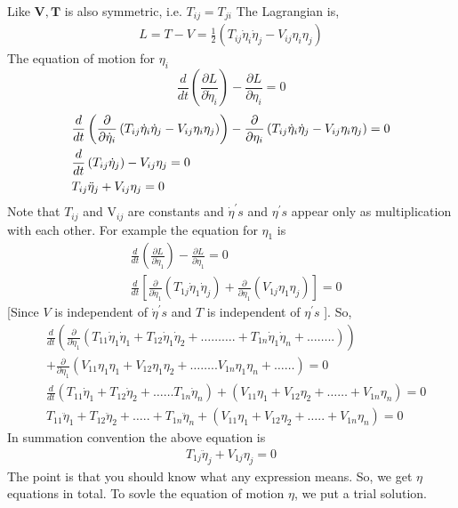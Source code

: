 Like $\mathbf{V}, \mathbf{T}$ is also symmetric, i.e. $T_{i j}=T_{j i}$
The Lagrangian is, 
\begin{align}
L=T-V=\frac{1}{2}\left(T_{i j} \dot{\eta}_{i} \dot{\eta}_{j}-V_{i j} \eta_{i} \eta_{j}\right)\label{ref8}
\end{align}
The equation of motion for $\eta_{i}$
$$
\frac{d}{d t}\left(\frac{\partial L}{\partial \dot{\eta}_{i}}\right)-\frac{\partial L}{\partial \eta_{i}}=0
$$
\begin{align}
&\frac{d}{d t}\left(\frac{\partial}{\partial \dot{\eta}_{i}}\left(T_{i j} \dot{\eta}_{i} \dot{\eta}_{j}-V_{i j} \eta_{i} \eta_{j}\right)\right)-\frac{\partial}{\partial \eta_{i}}\left(T_{i j} \dot{\eta}_{i} \dot{\eta}_{j}-V_{i j} \eta_{i} \eta_{j}\right)=0 \notag \\
&\frac{d}{d t}\left(T_{i j} \dot{\eta}_{j}\right)-V_{i j} \eta_{j}=0 \notag \\
&T_{i j} \ddot{\eta}_{j}+V_{i j} \eta_{j}=0 \label{ref9}
\end{align}
Note that $T_{i j}$ and $\mathrm{V}_{i j}$ are constants and $\dot{\eta}^{\prime} s$ and $\eta^{\prime} s$ appear only as multiplication with each other. For example the equation for $\eta_{1}$ is
\begin{align*}
&\frac{d}{d t}\left(\frac{\partial L}{\partial \dot{\eta}_{1}}\right)-\frac{\partial L}{\partial \eta_{1}}=0 \\
&\frac{d}{d t}\left[\frac{\partial}{\partial \dot{\eta}_{1}}\left(T_{1 j} \dot{\eta}_{1} \dot{\eta}_{j}\right)+\frac{\partial}{\partial \eta_{1}}\left(V_{1 j} \eta_{1} \eta_{j}\right)\right]=0
\end{align*}
[Since $V$ is independent of $\dot{\eta}^{\prime} s$ and $T$ is independent of $\eta^{\prime} s$ ]. So,
\begin{align*}
&\frac{d}{d t}\left(\frac{\partial}{\partial \dot{\eta}_{1}}\left(T_{11} \dot{\eta}_{1} \dot{\eta}_{1}+T_{12} \dot{\eta}_{1} \dot{\eta}_{2}+\ldots \ldots \ldots .+T_{1 n} \dot{\eta}_{1} \dot{\eta}_{n}+\ldots \ldots . .\right)\right)\\
&+\frac{\partial}{\partial \eta_{1}}\left(V_{11} \eta_{1} \eta_{1}+V_{12} \eta_{1} \eta_{2}+\ldots \ldots . . V_{1 n} \eta_{1} \eta_{n}+\ldots \ldots\right)=0 \\
&\frac{d}{d t}\left(T_{11} \dot{\eta}_{1}+T_{12} \dot{\eta}_{2}+\ldots \ldots T_{1 n} \dot{\eta}_{n}\right)+\left(V_{11} \eta_{1}+V_{12} \eta_{2}+\ldots \ldots+V_{1 n} \eta_{n}\right)=0 \\
&T_{11} \ddot{\eta}_{1}+T_{12} \ddot{\eta}_{2}+\ldots . .+T_{1 n} \ddot{\eta}_{n}+\left(V_{11} \eta_{1}+V_{12} \eta_{2}+\ldots . .+V_{1 n} \eta_{n}\right)=0
\end{align*}
In summation convention the above equation is
\begin{align}
T_{1 j} \ddot{\eta}_{j}+V_{1 j} \eta_{j}=0\label{ref10}
\end{align}
The point is that you should know what any expression means. So, we get $\eta$ equations in total.
To sovle the equation of motion $\eta$, we put a trial solution.


